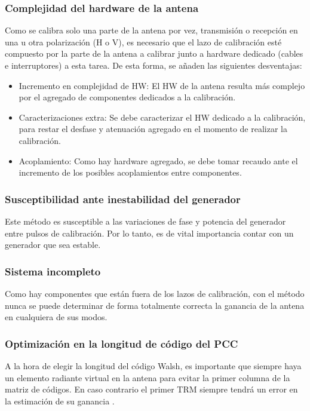 \subsubsection{Complejidad del hardware de la antena}

Como se calibra solo una parte de la antena por vez, transmisión o recepción en una u otra polarización (H o V), es necesario
que el lazo de calibración esté compuesto por la parte de la antena a calibrar junto a hardware dedicado (cables e interruptores) a
esta tarea. De esta forma, se añaden las siguientes desventajas:

\begin{itemize}
	\item Incremento en complejidad de HW: El HW de la antena resulta más complejo por el agregado de componentes dedicados a la
		calibración.
	\item Caracterizaciones extra: Se debe caracterizar el HW dedicado a la calibración, para restar el desfase y atenuación
		agregado en el momento de realizar la calibración.
	\item Acoplamiento: Como hay hardware agregado, se debe tomar recaudo ante el incremento de los posibles acoplamientos entre
		componentes.	
\end{itemize}


\subsubsection{Susceptibilidad ante inestabilidad del generador}

Este método es susceptible a las variaciones de fase y potencia del generador entre pulsos de calibración. Por lo tanto, es de
vital importancia contar con un generador que sea estable.


\subsubsection{Sistema incompleto}

Como hay componentes que están fuera de los lazos de calibración, con el método nunca se puede determinar de forma totalmente
correcta la ganancia de la antena en cualquiera de sus modos.


\subsubsection{Optimización en la longitud de código del PCC}

A la hora de elegir la longitud del código Walsh, es importante que siempre haya un elemento radiante virtual en la antena para
evitar la primer columna de la matriz de códigos. En caso contrario el primer TRM siempre tendrá un error en la estimación de
su ganancia \cite{Wang2010}.


